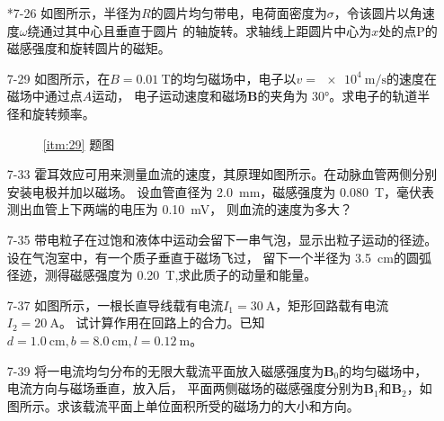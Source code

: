 \documentclass[UTF-8]{ctexart}
\makeatletter
\newcommand{\mlabel}[2]{#2\def\@currentlabel{#2}\label{#1}}
\newcommand{\csi}[2]{ \SI{#1}{#2}}
\makeatother
\begin{document}
\begin{enumerate}
    \item[\mlabel{itm:26}{*7-26}] 如图所示，半径为\(R\)的圆片均匀带电，电荷面密度为\(\sigma\)，令该圆片以角速度\(\omega\)绕通过其中心且垂直于圆片
        的轴旋转。求轴线上距圆片中心为\(x\)处的点P的磁感强度和旋转圆片的磁矩。
    
    \item[\mlabel{itm:29}{7-29}] 如图所示，在\(B=\csi{0.01}{\tesla}\)的均匀磁场中，电子以\(v=\csi{e4}{\m\per\s}\)的速度在磁场中通过点\(A\)运动，
        电子运动速度和磁场\(\bm{B}\)的夹角为 \ang{30}。求电子的轨道半径和旋转频率。
        \begin{figure}[htb]
            \centering
            \begin{minipage}[b]{0.4\textwidth}
                \centering
                \caption{\ref{itm:29} 题图}
            \end{minipage}
        \end{figure}

    \item[\mlabel{itm:33}{7-33}] 霍耳效应可用来测量血流的速度，其原理如图所示。在动脉血管两侧分别安装电极并加以磁场。
        设血管直径为\csi{2.0}{\mm}，磁感强度为\csi{0.080}{\tesla}，毫伏表测出血管上下两端的电压为\csi{0.10}{\mV}，
        则血流的速度为多大？
    
    \item[7-35] 带电粒子在过饱和液体中运动会留下一串气泡，显示出粒子运动的径迹。设在气泡室中，有一个质子垂直于磁场飞过，
        留下一个半径为\csi{3.5}{\cm}的圆弧径迹，测得磁感强度为\csi{0.20}{\tesla},求此质子的动量和能量。
    
    \item[\mlabel{itm:37}{7-37}] 如图所示，一根长直导线载有电流\(I_1=\csi{30}{\A}\)，矩形回路载有电流\(I_2=\csi{20}{\A}\)。
        试计算作用在回路上的合力。已知\(d=\csi{1.0}{\cm},b=\csi{8.0}{\cm},l=\csi{0.12}{\m}\)。
    
    \item[\mlabel{itm:39}{7-39}] 将一电流均匀分布的无限大载流平面放入磁感强度为\(\bm{B}_0\)的均匀磁场中，电流方向与磁场垂直，放入后，
        平面两侧磁场的磁感强度分别为\(\bm{B}_1\)和\(\bm{B}_2\)，如图所示。求该载流平面上单位面积所受的磁场力的大小和方向。
    

\end{enumerate}
\end{document}
